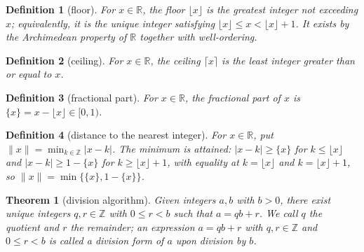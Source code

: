\documentclass[11pt]{article}
\theoremstyle{ntstyle}
\newtheorem{theorem}{Theorem}[subsection]
\newtheorem{definition}{Definition}[subsection]
\begin{document}
\begin{definition}[floor]\label{def:1.2.1}
	For $x\in\mathbb{R}$, the floor $\lfloor x\rfloor$ is the greatest integer not exceeding $x$;
	equivalently, it is the unique integer satisfying $\lfloor x\rfloor\le x<\lfloor x\rfloor+1$.
	It exists by the Archimedean property of $\mathbb{R}$ together with well-ordering.
\end{definition}
\begin{definition}[ceiling]\label{def:1.2.2}
	For $x\in\mathbb{R}$, the ceiling $\lceil x\rceil$ is the least integer greater than or equal to $x$.
\end{definition}
\begin{definition}[fractional part]\label{def:1.2.3}
	For $x\in\mathbb{R}$, the fractional part of $x$ is $\{x\}=x-\lfloor x\rfloor\in[0,1)$.
\end{definition}
\begin{definition}[distance to the nearest integer]\label{def:1.2.4}
	For $x\in\mathbb{R}$, put $\lVert x\rVert=\min_{k\in\mathbb{Z}}|x-k|$. The minimum is attained:
	$|x-k|\ge\{x\}$ for $k\le\lfloor x\rfloor$ and $|x-k|\ge1-\{x\}$ for $k\ge\lfloor x\rfloor+1$,
	with equality at $k=\lfloor x\rfloor$ and $k=\lfloor x\rfloor+1$, so $\lVert
	x\rVert=\min\{\{x\},1-\{x\}\}$.
\end{definition}
\begin{theorem}[division algorithm]\label{thm:1.2.1}
	Given integers $a,b$ with $b>0$, there exist unique integers $q,r\in\mathbb{Z}$ with $0\le r<b$ such that $a=qb+r$.
	We call $q$ the quotient and $r$ the remainder; an expression $a=qb+r$ with $q,r\in\mathbb{Z}$ and
	$0\le r<b$ is called a division form of $a$ upon division by $b$.
\end{theorem}
\end{document}
